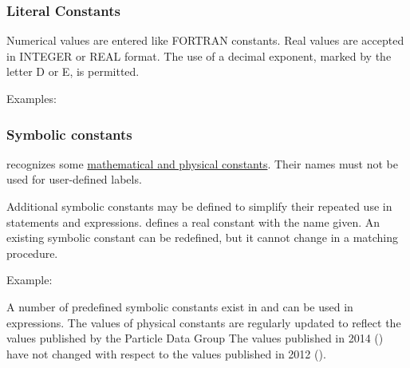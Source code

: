 \subsubsection{Literal Constants} 
Numerical values are entered like FORTRAN constants. Real values are
accepted in INTEGER or REAL format. The use of a decimal exponent,
marked by the letter D or E, is permitted.  

Examples: 

\subsubsection{Symbolic constants}
\label{subsubsec:symbolic_const}
\madx recognizes some \hyperref[tab-constants]{mathematical and physical
constants}. Their names must not be used for user-defined labels.  

Additional symbolic constants may be defined to simplify their repeated
use in statements and expressions.  
defines a real constant with the name given. An existing symbolic
constant can be redefined, but it cannot change in a matching procedure.  

Example: 

A number of predefined symbolic constants exist in \madx and can be used
in expressions. The values of physical constants are regularly updated
to reflect the values published by the Particle Data Group \cite{PDG2014} 
The values published in 2014 (\cite{PDG2014}) have not changed with respect to 
the values published in 2012 (\cite{PDG2012}).

